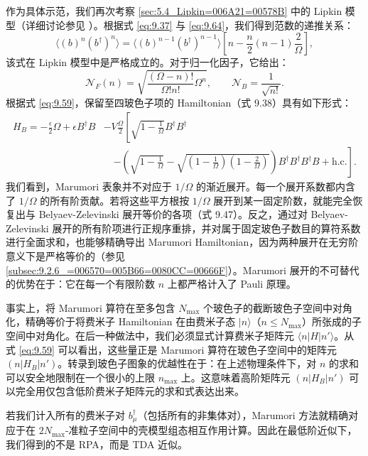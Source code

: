 作为具体示范，我们再次考察 \ref{sec:5.4_Lipkin=006A21=00578B} 中的 Lipkin 模型（详细讨论参见
\cite{PKD68}）。根据式 \ref{eq:9.37} 与 \ref{eq:9.64}，我们得到范数的递推关系：
\begin{equation}
\langle(b)^{n}(b^{\dagger})^{n}\rangle=\langle(b)^{n-1}(b^{\dagger})^{n-1}\rangle\left[n-\frac{n}{2}(n-1)\frac{2}{\Omega}\right],\label{eq:9.66}
\end{equation}
该式在 Lipkin 模型中是严格成立的。对于归一化因子，它给出：
\begin{equation}
\mathscr{N}_{F}(n)=\sqrt{\frac{(\Omega-n)!}{\Omega!n!}\Omega^{n}},\qquad\mathscr{N}_{B}=\frac{1}{\sqrt{n!}}.\label{eq:9.67}
\end{equation}
根据式 \ref{eq:9.59}，保留至四玻色子项的 Hamiltonian（式 9.38）具有如下形式：
\begin{align}
H_{B}=-\frac{\epsilon}{2}\Omega+\epsilon B^{\dagger}B & -V\frac{\Omega}{2}\left[\sqrt{1-\frac{1}{\Omega}}B^{\dagger}B^{\dagger}\right.\nonumber \\
 & \quad\left.-\left(\sqrt{1-\frac{1}{\Omega}}-\sqrt{\left(1-\frac{1}{\Omega}\right)\left(1-\frac{2}{\Omega}\right)}\right)B^{\dagger}B^{\dagger}B^{\dagger}B+\text{h.c.}\right].\label{eq:9.68}
\end{align}
我们看到，Marumori 表象并不对应于 $1/\Omega$ 的渐近展开。每一个展开系数都内含了 $1/\Omega$ 的所有阶贡献。若将这些平方根按
$1/\Omega$ 展开到某一固定阶数，就能完全恢复出与 Belyaev-Zelevinski 展开等价的各项（式 9.47）。反之，通过对
Belyaev-Zelevinski 展开的所有阶项进行正规序重排，并对属于固定玻色子数目的算符系数进行全面求和，也能够精确导出 Marumori
Hamiltonian，因为两种展开在无穷阶意义下是严格等价的（参见 \ref{subsec:9.2.6_=006570=005B66=0080CC=00666F}）。Marumori
展开的不可替代的优势在于：它在每一个有限阶数 $n$ 上都严格计入了 Pauli 原理。

事实上，将 Marumori 算符在至多包含 $N_{\text{max}}$ 个玻色子的截断玻色子空间中对角化，精确等价于将费米子
Hamiltonian 在由费米子态 $|n\rangle$（$n\le N_{\text{max}}$）所张成的子空间中对角化。在后一种做法中，我们必须显式计算费米子矩阵元
$\langle n|H|n'\rangle$。从式 \ref{eq:9.59} 可以看出，这些量正是 Marumori 算符在玻色子空间中的矩阵元
$(n|H_{B}|n')$。转录到玻色子图象的优越性在于：在上述物理条件下，对 $n$ 的求和可以安全地限制在一个很小的上限
$n_{\text{max}}$ 上。这意味着高阶矩阵元 $(n|H_{B}|n')$ 可以完全用仅包含低阶费米子矩阵元的求和式表达出来。

若我们计入所有的费米子对 $b^{\dagger}_{\mu}$（包括所有的非集体对），Marumori 方法就精确对应于在 $2N_{\text{max}}$-准粒子空间中的壳模型组态相互作用计算。因此在最低阶近似下，我们得到的不是
RPA，而是 TDA 近似。

